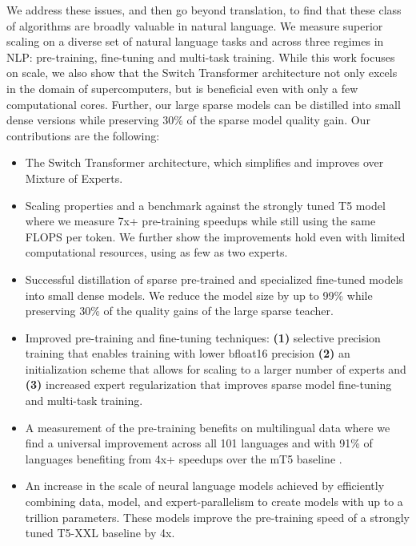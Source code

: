 \documentclass[twoside,11pt]{article}
\begin{document}
We address these issues, and then go beyond translation, to find that these class of algorithms are broadly valuable in natural language.
We measure superior scaling on a diverse set of natural language tasks and across three regimes in NLP: pre-training, fine-tuning and multi-task training.
While this work focuses on scale, we also show that the Switch Transformer architecture not only excels in the domain of supercomputers, but is beneficial even with only a few computational cores.
Further, our large sparse models can be distilled \citep{hinton2015distilling} into small dense versions while preserving 30\% of the sparse model quality gain.
Our contributions are the following:

\begin{itemize}
    \item The Switch Transformer architecture, which simplifies and improves over Mixture of Experts.
    
    \item Scaling properties and a benchmark against the strongly tuned T5 model \citep{raffel2019exploring} where we measure 7x+ pre-training speedups while still using the same FLOPS per token. We further show the improvements hold even with limited computational resources, using as few as two experts.
    
    \item Successful distillation of sparse pre-trained and specialized fine-tuned models into small dense models. We reduce the model size by up to 99\% while preserving 30\% of the quality gains of the large sparse teacher.
    
    \item Improved pre-training and fine-tuning techniques: \textbf{(1)} selective precision training that enables training with lower bfloat16 precision \textbf{(2)} an initialization scheme that allows for scaling to a larger number of experts and \textbf{(3)} increased expert regularization that improves sparse model fine-tuning and multi-task training.
    
    \item A measurement of the pre-training benefits on multilingual data where we find a universal improvement across all 101 languages and with 91\% of languages benefiting from 4x+ speedups over the mT5 baseline \citep{xue2020mt5}.
    
    \item An increase in the scale of neural language models achieved by efficiently combining data, model, and expert-parallelism to create models with up to a trillion parameters.
    These models improve the pre-training speed of a strongly tuned T5-XXL baseline by 4x.
\end{itemize}
\end{document}
